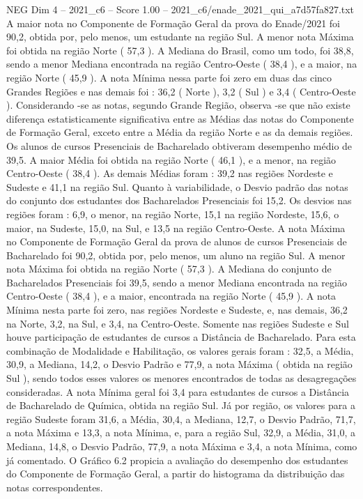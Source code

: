 \begin{textsample}{NEG Dim 4 – 2021\_c6 – Score 1.00 – 2021\_c6/enade\_2021\_qui\_a7d57fa827.txt}
A maior nota no Componente de Formação Geral da prova do Enade/2021 foi 90,2, obtida por, pelo menos, um estudante na região Sul.
A menor nota Máxima foi obtida na região Norte ( 57,3 ).
A Mediana do Brasil, como um todo, foi 38,8, sendo a menor Mediana encontrada na região Centro-Oeste ( 38,4 ), e a maior, na região Norte ( 45,9 ).
A nota Mínima nessa parte foi zero em duas das cinco Grandes Regiões e nas demais foi : 36,2 ( Norte ), 3,2 ( Sul ) e 3,4 ( Centro-Oeste ).
Considerando -se as notas, segundo Grande Região, observa -se que não existe diferença estatisticamente significativa entre as Médias das notas do Componente de Formação Geral, exceto entre a Média da região Norte e as da demais regiões.
Os alunos de cursos Presenciais de Bacharelado obtiveram desempenho médio de 39,5.
A maior Média foi obtida na região Norte ( 46,1 ), e a menor, na região Centro-Oeste ( 38,4 ).
As demais Médias foram : 39,2 nas regiões Nordeste e Sudeste e 41,1 na região Sul.
Quanto à variabilidade, o Desvio padrão das notas do conjunto dos estudantes dos Bacharelados Presenciais foi 15,2.
Os desvios nas regiões foram : 6,9, o menor, na região Norte, 15,1 na região Nordeste, 15,6, o maior, na Sudeste, 15,0, na Sul, e 13,5 na região Centro-Oeste.
A nota Máxima no Componente de Formação Geral da prova de alunos de cursos Presenciais de Bacharelado foi 90,2, obtida por, pelo menos, um aluno na região Sul.
A menor nota Máxima foi obtida na região Norte ( 57,3 ).
A Mediana do conjunto de Bacharelados Presenciais foi 39,5, sendo a menor Mediana encontrada na região Centro-Oeste ( 38,4 ), e a maior, encontrada na região Norte ( 45,9 ).
A nota Mínima nesta parte foi zero, nas regiões Nordeste e Sudeste, e, nas demais, 36,2 na Norte, 3,2, na Sul, e 3,4, na Centro-Oeste.
Somente nas regiões Sudeste e Sul houve participação de estudantes de cursos a Distância de Bacharelado.
Para esta combinação de Modalidade e Habilitação, os valores gerais foram : 32,5, a Média, 30,9, a Mediana, 14,2, o Desvio Padrão e 77,9, a nota Máxima ( obtida na região Sul ), sendo todos esses valores os menores encontrados de todas as desagregações consideradas.
A nota Mínima geral foi 3,4 para estudantes de cursos a Distância de Bacharelado de Química, obtida na região Sul.
Já por região, os valores para a região Sudeste foram 31,6, a Média, 30,4, a Mediana, 12,7, o Desvio Padrão, 71,7, a nota Máxima e 13,3, a nota Mínima, e, para a região Sul, 32,9, a Média, 31,0, a Mediana, 14,8, o Desvio Padrão, 77,9, a nota Máxima e 3,4, a nota Mínima, como já comentado.
O Gráfico 6.2 propicia a avaliação do desempenho dos estudantes do Componente de Formação Geral, a partir do histograma da distribuição das notas correspondentes.

\end{textsample}
